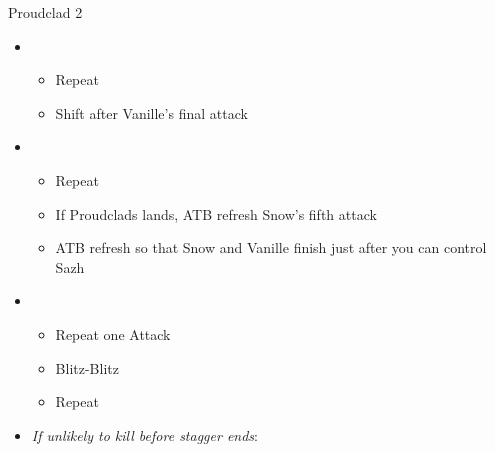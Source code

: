 \documentclass{report}
\begin{document}
\begin{battle}{Proudclad 2}
\begin{multicols}{2}
\begin{itemize}
\begin{itemize}
        \item \textit{Oneric Maelstrom}:
        \begin{itemize}
            \item Renew to prevent Sazh from Launching
            \item Auto-chain 2 spells
            \item Cold Blood
        \end{itemize}
        \item \textit{Muon Blaster $\rightarrow$ Onearic Maelstrom}
        \begin{itemize}
            \item Renew to prevent Sazh from Launching
            \item Cold Blood
        \end{itemize}
        \item \textit{Muon Blaster $\rightarrow$ Muon Blaster}
        \begin{itemize}
            \item Cold Blood to prevent Sazh's interruption
        \end{itemize}
        \item ATB refresh after Cold Blood starts to maximize Launches
    \end{itemize}
    \item \fifth
    \begin{itemize}
        \item Repeat
        \item Shift after Vanille's final attack
    \end{itemize}
    \item \first
    \begin{itemize}
        \item Repeat
        \item If Proudclads lands, ATB refresh Snow's fifth attack
        \item ATB refresh so that Snow and Vanille finish just after you can control Sazh
    \end{itemize}
    \item \second
    \begin{itemize}
        \item Repeat one Attack
        \item Blitz-Blitz
        \item Repeat
    \end{itemize}
    \columnbreak
    \item \textit{If unlikely to kill before stagger ends}:

\end{itemize}
\end{multicols}
\end{battle}
\end{document}
